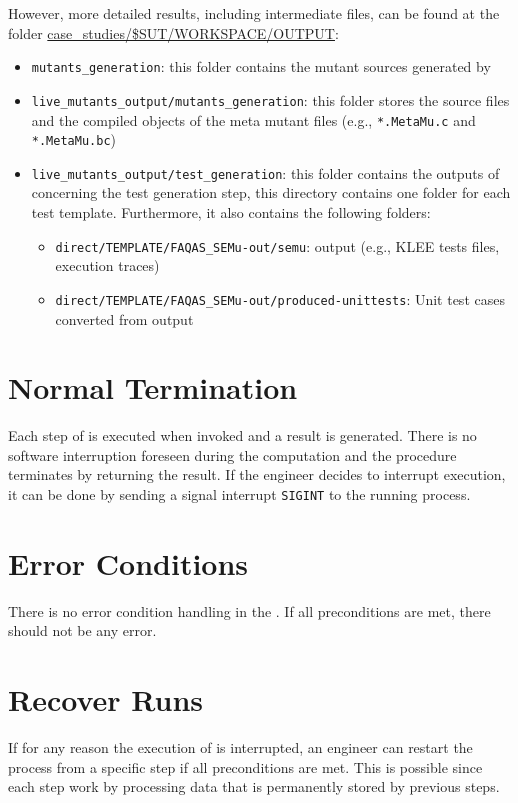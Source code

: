 However, more detailed results, including intermediate files, can be found at the folder \url{case_studies/$SUT/WORKSPACE/OUTPUT}:

\begin{itemize}
	\item \texttt{mutants\_generation}: this folder contains the mutant sources generated by \MASS
	\item \texttt{live\_mutants\_output/mutants\_generation}: this folder stores the source files and the compiled objects of the meta mutant files (e.g., \texttt{*.MetaMu.c} and \texttt{*.MetaMu.bc})
	\item \texttt{live\_mutants\_output/test\_generation}: this folder contains the outputs of \SEMUS concerning the test generation step, this directory contains one folder for each test template. Furthermore, it also contains the following folders:
	\begin{itemize}
		\item \texttt{direct/TEMPLATE/FAQAS\_SEMu-out/semu}: \SEMU output (e.g., KLEE tests files, execution traces)
		\item \texttt{direct/TEMPLATE/FAQAS\_SEMu-out/produced-unittests}: Unit test cases converted from \SEMU output
	\end{itemize}

\end{itemize}



\section{Normal Termination}


Each step of \SEMUS is executed when invoked and a result is generated. There is no software interruption foreseen during the computation and the procedure terminates by returning the result.
If the engineer decides to interrupt \SEMUS execution, it can be done by sending a signal interrupt \texttt{SIGINT} to the running process.

\section{Error Conditions}

There is no error condition handling in the \FAQAS. If all preconditions are met, there should not be any error.

\section{Recover Runs}


If for any reason the execution of \SEMUS is interrupted, an engineer can restart the process from a specific step if all preconditions are met. This is possible since each \SEMUS step work by processing data that is permanently stored by previous steps.
